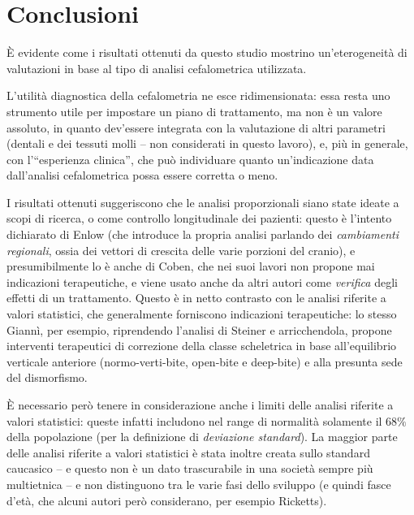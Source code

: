 \chapter{Conclusioni}

È evidente come i risultati ottenuti da questo studio mostrino un'eterogeneità di valutazioni in base al tipo di analisi cefalometrica utilizzata.

L'utilità diagnostica della cefalometria ne esce ridimensionata: essa resta uno strumento utile per impostare un piano di trattamento, ma non è un valore assoluto, in quanto dev'essere integrata con la valutazione di altri parametri (dentali e dei tessuti molli -- non considerati in questo lavoro), e, più in generale, con l'``esperienza clinica'', che può individuare quanto un'indicazione data dall'analisi cefalometrica possa essere corretta o meno.

I risultati ottenuti suggeriscono che le analisi proporzionali siano state ideate a scopi di ricerca, o come controllo longitudinale dei pazienti: questo è l'intento dichiarato di Enlow (che introduce la propria analisi parlando dei \emph{cambiamenti regionali}, ossia dei vettori di crescita delle varie porzioni del cranio), e presumibilmente lo è anche di Coben, che nei suoi lavori non propone mai indicazioni terapeutiche, e viene usato anche da altri autori come \emph{verifica} degli effetti di un trattamento. Questo è in netto contrasto con le analisi riferite a valori statistici, che generalmente forniscono indicazioni terapeutiche: lo stesso Giannì, per esempio, riprendendo l'analisi di Steiner e arricchendola, propone interventi terapeutici di correzione della classe scheletrica in base all'equilibrio verticale anteriore (normo-verti-bite, open-bite e deep-bite) e alla presunta sede del dismorfismo.

È necessario però tenere in considerazione anche i limiti delle analisi riferite a valori statistici: queste infatti includono nel range di normalità solamente il $68\%$ della popolazione (per la definizione di \emph{deviazione standard}). La maggior parte delle analisi riferite a valori statistici è stata inoltre creata sullo standard caucasico -- e questo non è un dato trascurabile in una società sempre più multietnica -- e non distinguono tra le varie fasi dello sviluppo (e quindi fasce d'età, che alcuni autori però considerano, per esempio Ricketts).


